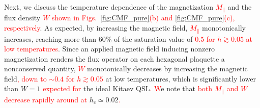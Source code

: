\documentclass[twocolumn,superscriptaddress,showpacs, longbibliography, aps, prb]{revtex4-2}
\newcommand{\red}[1]{\textcolor{red}{#1}}
\begin{document}
Next, we %
discuss the temperature dependence of the magnetization \red{$M_\parallel$} and the flux density \red{$W$ shown in Figs.~\ref{fig:CMF_pure}(b) and \ref{fig:CMF_pure}(c), respectively}. 
As expected, by increasing the magnetic field, 
\red{$M_\parallel$} monotonically increases, %
reaching more than 60\% of the saturation value of %
\red{$0.5$ %
for $h\gtrsim 0.05$ at low temperatures}. 
Since an applied magnetic field inducing nonzero magnetization renders %
the flux operator on each hexagonal plaquette a nonconserved quantity, %
\red{$W$} monotonically decreases by increasing the magnetic field\red{, %
down to $\sim 0.4$ for $h\gtrsim 0.05$} at low temperatures, 
which is significantly %
lower than $W=1$ \red{expected for} %
the ideal Kitaev QSL\red{.
W}e note that %
\red{both $M_{\parallel}$ and $W$ decrease rapidly around at} 
$h_c \simeq 0.02$\red{.} %
\end{document}
